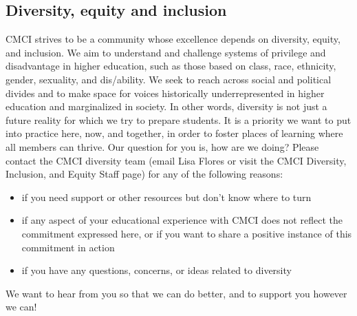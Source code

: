 \subsection{Diversity, equity and inclusion}
CMCI strives to be a community whose excellence depends on diversity, equity, and inclusion. We aim to understand and challenge systems of privilege and disadvantage in higher education, such as those based on class, race, ethnicity, gender, sexuality, and dis/ability. We seek to reach across social and political divides and to make space for voices historically underrepresented in higher education and marginalized in society. In other words, diversity is not just a future reality for which we try to prepare students. It is a priority we want to put into practice here, now, and together, in order to foster places of learning where all members can thrive. Our question for you is, how are we doing? Please contact the CMCI diversity team (email Lisa Flores or visit the CMCI Diversity, Inclusion, and Equity Staff page) for any of the following reasons:
\begin{itemize}
    \item if you need support or other resources but don’t know where to turn
    \item if any aspect of your educational experience with CMCI does not reflect the commitment expressed here, or if you want to share a positive instance of this commitment in action
    \item if you have any questions, concerns, or ideas related to diversity
\end{itemize}

We want to hear from you so that we can do better, and to support you however we can!
